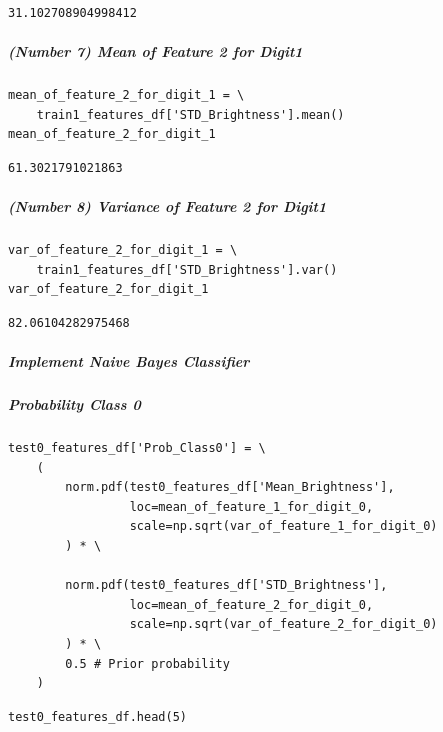 \begin{verbatim}
31.102708904998412
\end{verbatim}

\subparagraph{(Number 7) Mean of Feature 2 for Digit1}

\begin{verbatim}
mean_of_feature_2_for_digit_1 = \
    train1_features_df['STD_Brightness'].mean()
mean_of_feature_2_for_digit_1
\end{verbatim}

\begin{verbatim}
61.3021791021863
\end{verbatim}

\subparagraph{(Number 8) Variance of Feature 2 for Digit1}

\begin{verbatim}
var_of_feature_2_for_digit_1 = \
    train1_features_df['STD_Brightness'].var()
var_of_feature_2_for_digit_1
\end{verbatim}

\begin{verbatim}
82.06104282975468
\end{verbatim}

\subparagraph{Implement Naive Bayes Classifier}

\subparagraph{Probability Class 0}

\begin{verbatim}
test0_features_df['Prob_Class0'] = \
    (
        norm.pdf(test0_features_df['Mean_Brightness'],
                 loc=mean_of_feature_1_for_digit_0,
                 scale=np.sqrt(var_of_feature_1_for_digit_0)
        ) * \

        norm.pdf(test0_features_df['STD_Brightness'],
                 loc=mean_of_feature_2_for_digit_0,
                 scale=np.sqrt(var_of_feature_2_for_digit_0)
        ) * \
        0.5 # Prior probability
    )
\end{verbatim}

\begin{verbatim}
test0_features_df.head(5)
\end{verbatim}

